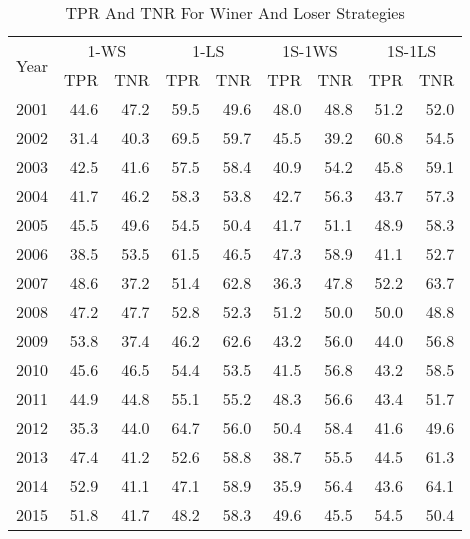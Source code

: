 \documentclass{article}
\begin{document}
\begin{table}[!ht]
    \centering
    \caption{TPR And TNR For Winer And Loser Strategies}
    \begin{tabular}{l | rr| rr | rr| rr}
    \hline
\multirow{2}{*}{Year} & \multicolumn{2}{c|}{1-WS }   
& \multicolumn{2}{c|}{1-LS}  & \multicolumn{2}{c}{1S-1WS} & \multicolumn{2}{c}{1S-1LS}  \\
 & TPR & TNR &  TPR & TNR &  TPR & TNR &  TPR & TNR \\
\hline
2001 & \cellcolor{red!25}44.6 & 47.2 & \cellcolor{green!25}59.5 & 49.6 & 48.0 & 48.8 & 51.2 & 52.0 \\
2002 & \cellcolor{red!25}31.4 & 40.3 & \cellcolor{green!25}69.5 & 59.7 & 45.5 & 39.2 & 60.8 & 54.5 \\
2003 & 42.5 & 41.6 & 57.5 & 58.4 & \cellcolor{red!25}40.9 & 54.2 & 45.8 & \cellcolor{green!25}59.1 \\
2004 & \cellcolor{red!25}41.7 & 46.2 & \cellcolor{green!25}58.3 & 53.8 & 42.7 & 56.3 & 43.7 & 57.3 \\
2005 & 45.5 & 49.6 & 54.5 & 50.4 & \cellcolor{red!25}41.7 & 51.1 & 48.9 & \cellcolor{green!25}58.3 \\
2006 & \cellcolor{red!25}38.5 & 53.5 & \cellcolor{green!25}61.5 & 46.5 & 47.3 & 58.9 & 41.1 & 52.7 \\
2007 & 48.6 & 37.2 & 51.4 & 62.8 & \cellcolor{red!25}36.3 & 47.8 & 52.2 & \cellcolor{green!25}63.7 \\
2008 & \cellcolor{red!25}47.2 & 47.7 & \cellcolor{green!25}52.8 & 52.3 & 51.2 & 50.0 & 50.0 & 48.8 \\
2009 & 53.8 & \cellcolor{red!25}37.4 & 46.2 & \cellcolor{green!25}62.6 & 43.2 & 56.0 & 44.0 & 56.8 \\
2010 & 45.6 & 46.5 & 54.4 & 53.5 & \cellcolor{red!25}41.5 & 56.8 & 43.2 & \cellcolor{green!25}58.5 \\
2011 & 44.9 & 44.8 & 55.1 & 55.2 & 48.3 & \cellcolor{green!25}56.6 & \cellcolor{red!25}43.4 & 51.7 \\
2012 & \cellcolor{red!25}35.3 & 44.0 & \cellcolor{green!25}64.7 & 56.0 & 50.4 & 58.4 & 41.6 & 49.6 \\
2013 & 47.4 & 41.2 & 52.6 & 58.8 & \cellcolor{red!25}38.7 & 55.5 & 44.5 & \cellcolor{green!25}61.3 \\
2014 & 52.9 & 41.1 & 47.1 & 58.9 & \cellcolor{red!25}35.9 & 56.4 & 43.6 & \cellcolor{green!25}64.1 \\
2015 & 51.8 & \cellcolor{red!25}41.7 & 48.2 & \cellcolor{green!25}58.3 & 49.6 & 45.5 & 54.5 & 50.4 \\

\end{tabular}
\end{table}
\end{document}
